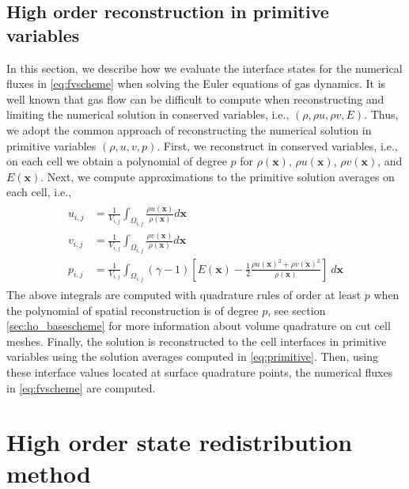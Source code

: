 \subsection{High order reconstruction in primitive variables} \label{sec:ho_reconstruction_primitive}
In this section, we describe how we evaluate the interface states for the numerical fluxes in \eqref{eq:fvscheme} when solving the Euler equations of gas dynamics.  It is well known that gas flow can be difficult to compute when reconstructing and limiting the numerical solution in conserved variables, i.e., $(\rho, \rho u, \rho v, E)$.  Thus, we adopt the common approach of reconstructing the numerical solution in primitive variables $(\rho, u, v, p)$.  First, we reconstruct in conserved variables, i.e., on each cell we obtain a polynomial of degree $p$ for $\rho(\mathbf{x})$, $\rho u(\mathbf{x})$, $\rho v(\mathbf{x})$, and $E(\mathbf{x})$.  Next, we compute approximations to the primitive solution averages on each cell, i.e.,
\begin{align} 
\begin{aligned}
u_{i,j} &= \frac{1}{V_{i,j}} \int_{\Omega_{i,j}} \frac{\rho u(\mathbf{x})}{\rho(\mathbf{x})} d\mathbf{x} \\
v_{i,j} &= \frac{1}{V_{i,j}} \int_{\Omega_{i,j}} \frac{\rho v(\mathbf{x})}{\rho(\mathbf{x})} d\mathbf{x} \\
p_{i,j} &= \frac{1}{V_{i,j}}\int_{\Omega_{i,j}} (\gamma-1) \left[E(\mathbf{x}) - \frac{1}{2}\frac{\rho u(\mathbf{x})^2+\rho v(\mathbf{x})^2}{\rho(\mathbf{x})} \right] ~d\mathbf{x}
\end{aligned}\label{eq:primitive}
\end{align}
The above integrals are computed with quadrature rules of order at least $p$ when the polynomial of spatial reconstruction is of degree $p$, see section \ref{sec:ho_basescheme} for more information about volume quadrature on cut cell meshes.  Finally, the solution is reconstructed to the cell interfaces in primitive variables using the solution averages computed in \eqref{eq:primitive}.  Then, using these interface values located at surface quadrature points, the numerical fluxes in \eqref{eq:fvscheme} are computed.

\section{High order state redistribution method} \label{sec:ho_reconstruction_q}


